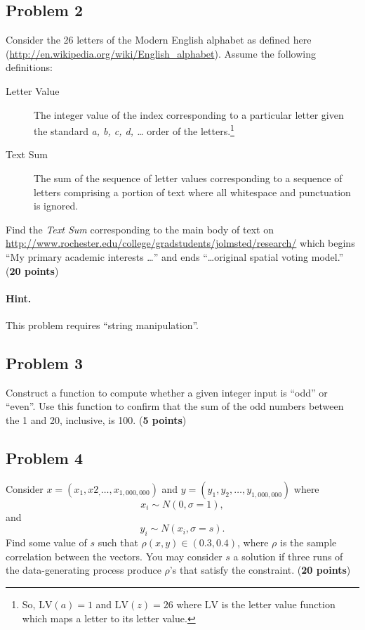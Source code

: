 \documentclass[10pt,letterpaper]{article}
\begin{document}
\subsection*{Problem 2}
Consider the 26 letters of the Modern English alphabet as defined here
(\url{http://en.wikipedia.org/wiki/English_alphabet}). Assume the
following definitions:
\begin{description}
\item [Letter Value] The integer value of the index corresponding to a
  particular letter given the standard \textit{a, b, c, d, \ldots}
  order of the letters.\footnote{So, $\textrm{LV}(a) = 1$ and
    $\textrm{LV}(z) = 26$ where $\textrm{LV}$ is the letter value
    function which maps a letter to its letter value.}

\item [Text Sum] The sum of the sequence of letter values
  corresponding to a sequence of letters comprising a portion of text
  where all whitespace and punctuation is ignored.
\end{description}

Find the \textit{Text Sum} corresponding to the main body of text on
\url{http://www.rochester.edu/college/gradstudents/jolmsted/research/}
which begins ``My primary academic interests \ldots'' and ends
``\ldots original spatial voting model.'' (\textbf{20 points})

\paragraph{Hint.} This problem requires ``string manipulation''.

% 

\subsection*{Problem 3}

Construct a function to compute whether a given integer input is
``odd'' or ``even''. Use this function to confirm that the sum of the
odd numbers between the 1 and 20, inclusive, is 100. (\textbf{5
  points})

% 

\subsection*{Problem 4}
Consider $x = (x_1, x2_, \ldots, x_{1,000,000})$ and $y = (y_1, y_2,
\ldots, y_{1,000,000})$ where
\[
x_i \sim N(0, \sigma = 1),
\]
and
\[
y_i \sim N(x_i, \sigma = s).
\]
Find some value of $s$ such that $\rho(x, y) \in (0.3, 0.4)$, where
$\rho$ is the sample correlation between the vectors. You may consider
$s$ a solution if three runs of the data-generating process produce
$\rho$'s that satisfy the constraint. (\textbf{20 points})
\end{document}
